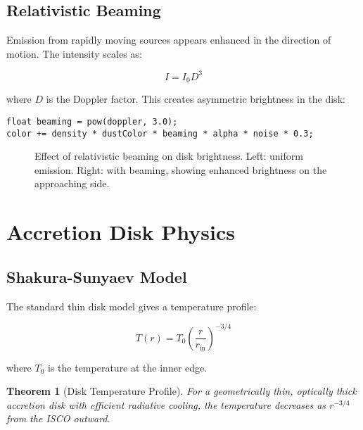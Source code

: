 \documentclass[12pt,a4paper]{article}
\newtheorem{theorem}{Theorem}[section]
\theoremstyle{definition}
\theoremstyle{remark}
\begin{document}
\subsection{Relativistic Beaming}

Emission from rapidly moving sources appears enhanced in the direction of motion. The intensity scales as:

\begin{equation}
    I = I_0 D^3
\end{equation}

where $D$ is the Doppler factor. This creates asymmetric brightness in the disk:

\begin{lstlisting}[style=metalstyle, caption=Relativistic beaming]
float beaming = pow(doppler, 3.0);
color += density * dustColor * beaming * alpha * noise * 0.3;
\end{lstlisting}

\begin{figure}[H]
    \centering
    \caption{Effect of relativistic beaming on disk brightness. Left: uniform emission. Right: with beaming, showing enhanced brightness on the approaching side.}
    \label{fig:beaming_comparison}
\end{figure}

\section{Accretion Disk Physics}

\subsection{Shakura-Sunyaev Model}

The standard thin disk model gives a temperature profile:

\begin{equation}
    T(r) = T_0 \left(\frac{r}{r_{\text{in}}}\right)^{-3/4}
\end{equation}

where $T_0$ is the temperature at the inner edge.

\begin{theorem}[Disk Temperature Profile]
For a geometrically thin, optically thick accretion disk with efficient radiative cooling, the temperature decreases as $r^{-3/4}$ from the ISCO outward.
\end{theorem}
\end{document}
